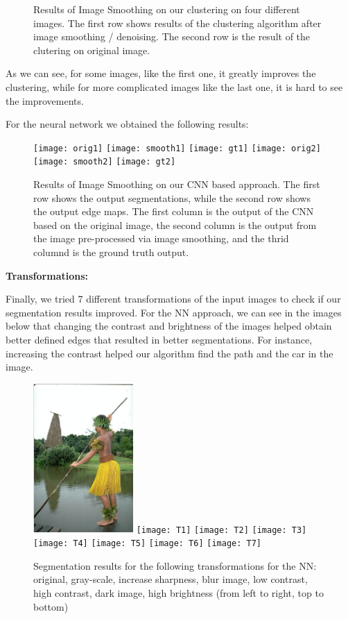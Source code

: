 \documentclass[11pt, twoside]{article}
\begin{document}
\begin{figure}[ht]
    \caption{Results of Image Smoothing on our clustering on four different images. The first row shows results of the clustering algorithm after image smoothing / denoising. The second row is the result of the clutering on original image. }
    \label{fig:reg3}
\end{figure}

As we can see, for some images, like the first one, it greatly improves the clustering, while for more complicated images like the last one, it is hard to see the improvements. 

For the neural network we obtained the following results: 

\begin{figure}[ht]
    \centering
    \texttt{[image: orig1]}
    \texttt{[image: smooth1]}
    \texttt{[image: gt1]}
    \texttt{[image: orig2]}
    \texttt{[image: smooth2]}
    \texttt{[image: gt2]}

    \caption{Results of Image Smoothing on our CNN based approach. The first row shows the output segmentations, while the second row shows the output edge maps. The first column is the output of the CNN based on the original image, the second column is the output from the image pre-processed via image smoothing, and the thrid columnd is the ground truth output.}
    \label{fig:reg2}
\end{figure}

\textbf{Transformations:}

Finally, we tried 7 different transformations of the input images to check if our segmentation results improved. For the NN approach, we can see in the images below that changing the contrast and brightness of the images helped obtain better defined edges that resulted in better segmentations. For instance, increasing the contrast helped our algorithm find the path and the car in the image.


\begin{figure}[ht]
    \centering
    \includegraphics[width=1.5in]{original}
    \texttt{[image: T1]}
    \texttt{[image: T2]}
    \texttt{[image: T3]}
    \texttt{[image: T4]}
    \texttt{[image: T5]}
    \texttt{[image: T6]}
    \texttt{[image: T7]}

    \caption{Segmentation results for the following transformations for the NN: original, gray-scale, increase sharpness, blur image, low contrast, high contrast, dark image, high brightness (from left to right, top to bottom)}
    \label{fig:reg4}
\end{figure}
\end{document}
